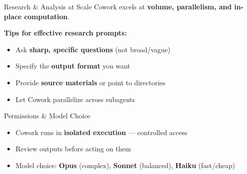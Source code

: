 \documentclass[aspectratio=169]{beamer}
\begin{document}
\begin{frame}{Research \& Analysis at Scale}
Cowork excels at \textbf{volume, parallelism, and in-place computation}.

\bigskip
\textbf{Tips for effective research prompts:}
\begin{itemize}
  \item Ask \textbf{sharp, specific questions} (not broad/vague)
  \item Specify the \textbf{output format} you want
  \item Provide \textbf{source materials} or point to directories
  \item Let Cowork parallelize across subagents
\end{itemize}

\bigskip
\begin{block}{Permissions \& Model Choice}
\begin{itemize}
  \item Cowork runs in \textbf{isolated execution} --- controlled access
  \item Review outputs before acting on them
  \item Model choice: \textbf{Opus} (complex), \textbf{Sonnet} (balanced), \textbf{Haiku} (fast/cheap)
\end{itemize}
\end{block}
\end{frame}
\end{document}
